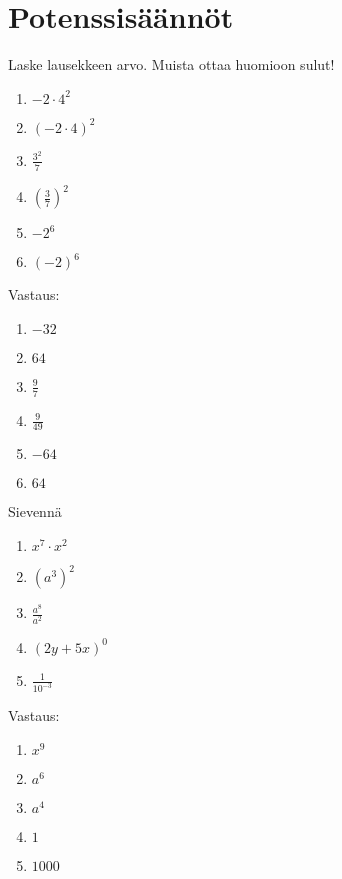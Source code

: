 \section{Potenssisäännöt}

\begin{tehtava}
Laske lausekkeen arvo. Muista ottaa huomioon sulut!
\begin{enumerate}
\item $-2\cdot 4^2$
\item $(-2\cdot 4)^2$
\item $\frac{3^2}{7}$
\item $\left( \frac{3}{7} \right)^2$
\item $-2^6$
\item $(-2)^6$
\end{enumerate}
\begin{vastaus}
Vastaus:
\begin{enumerate}
\item $-32$
\item $64$
\item $\frac{9}{7}$
\item $\frac{9}{49}$
\item $-64$
\item $64$
\end{enumerate}
\end{vastaus}
\end{tehtava}

\begin{tehtava}
Sievennä
\begin{enumerate}
\item $x^7\cdot x^2$
\item $(a^3)^2$
\item $\frac{a^8}{a^2}$
\item $(2y+5x)^0$
\item $\frac{1}{10^{-3}}$
\end{enumerate}
\begin{vastaus}
Vastaus:
\begin{enumerate}
\item $x^9$
\item $a^6$
\item $a^4$
\item $1$
\item $1000$
\end{enumerate}
\end{vastaus}
\end{tehtava}


